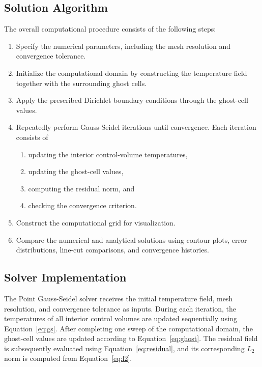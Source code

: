 
\subsection{Solution Algorithm}

The overall computational procedure consists of the following steps:

\begin{enumerate}
\item Specify the numerical parameters, including the mesh resolution and convergence tolerance.
\item Initialize the computational domain by constructing the temperature field together with the surrounding ghost cells.
\item Apply the prescribed Dirichlet boundary conditions through the ghost-cell values.
\item Repeatedly perform Gauss-Seidel iterations until convergence. Each iteration consists of
    \begin{enumerate}
        \item updating the interior control-volume temperatures,
        \item updating the ghost-cell values,
        \item computing the residual norm, and
        \item checking the convergence criterion.
    \end{enumerate}
\item Construct the computational grid for visualization.
\item Compare the numerical and analytical solutions using contour plots, error distributions, line-cut comparisons, and convergence histories.
\end{enumerate}


\subsection{Solver Implementation}

The Point Gauss-Seidel solver receives the initial temperature field, mesh resolution, and convergence tolerance as inputs. During each iteration, the temperatures of all interior control volumes are updated sequentially using Equation~\ref{eq:gs}. After completing one sweep of the computational domain, the ghost-cell values are updated according to Equation~\ref{eq:ghost}. The residual field is subsequently evaluated using Equation~\ref{eq:residual}, and its corresponding $L_2$ norm is computed from Equation~\ref{eq:l2}.

